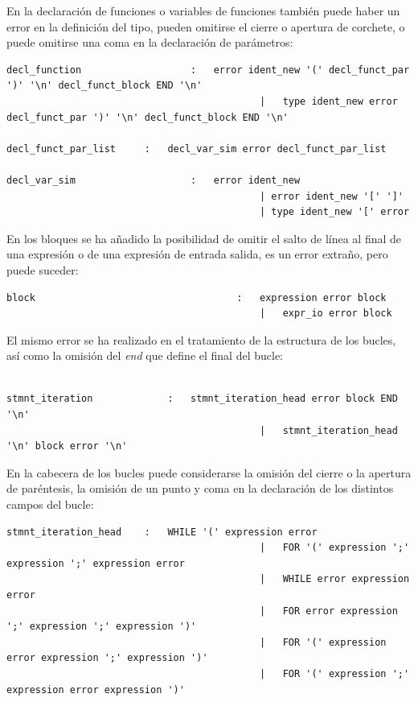 \documentclass[a4paper,10pt]{article}
\begin{document}
En la declaración de funciones o variables de funciones también puede haber un error en la definición del tipo, pueden omitirse el cierre o apertura de corchete, o puede omitirse una coma en la declaración de parámetros:

\begin{lstlisting}
decl_function					:	error ident_new '(' decl_funct_par ')' '\n' decl_funct_block END '\n'
											|	type ident_new error decl_funct_par ')' '\n' decl_funct_block END '\n'
										
decl_funct_par_list		:	decl_var_sim error decl_funct_par_list
											
decl_var_sim					:	error ident_new 
											| error ident_new '[' ']'
											| type ident_new '[' error
\end{lstlisting}

En los bloques se ha añadido la posibilidad de omitir el salto de línea al final de una expresión o de una expresión de entrada salida, es un error extraño, pero puede suceder:

\begin{lstlisting}
block									:	expression error block
											|	expr_io error block
\end{lstlisting}

El mismo error se ha realizado en el tratamiento de la estructura de los bucles, así como la omisión del \textit{end} que define el final del bucle:
\begin{lstlisting}
										
stmnt_iteration				:	stmnt_iteration_head error block END '\n'
											|	stmnt_iteration_head '\n' block error '\n'
\end{lstlisting}

En la cabecera de los bucles puede considerarse la omisión del cierre o la apertura de paréntesis, la omisión de un punto y coma en la declaración de los distintos campos del bucle:
\begin{lstlisting}
stmnt_iteration_head	:	WHILE '(' expression error 
											|	FOR '(' expression ';' expression ';' expression error
											|	WHILE error expression error 
											|	FOR error expression ';' expression ';' expression ')'
											|	FOR '(' expression error expression ';' expression ')'
											|	FOR '(' expression ';' expression error expression ')'
\end{lstlisting}
\end{document}
